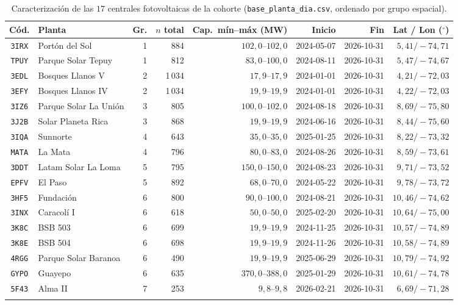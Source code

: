 \begin{table}[!htbp]
\caption{Caracterización de las $17$ centrales fotovoltaicas de la cohorte (\texttt{base\_planta\_dia.csv}, ordenado por grupo espacial).}\label{tab:flota17}
\scriptsize
\setlength{\tabcolsep}{3.5pt}
\begin{tabular}{@{}clrrrrrr@{}}
\toprule
Cód. & Planta & Gr. & $n$ total & Cap.\ mín--máx (MW) & Inicio & Fin & Lat / Lon ($^\circ$) \\
\midrule
\texttt{3IRX} & Portón del Sol & 1 & 884 & $102{,}0$--$102{,}0$ & 2024-05-07 & 2026-10-31 & $5{,}41 / -74{,}71$ \\
\texttt{TPUY} & Parque Solar Tepuy & 1 & 812 & $83{,}0$--$100{,}0$ & 2024-08-11 & 2026-10-31 & $5{,}47 / -74{,}67$ \\
\texttt{3EDL} & Bosques Llanos V & 2 & 1\,034 & $17{,}9$--$17{,}9$ & 2024-01-01 & 2026-10-31 & $4{,}21 / -72{,}03$ \\
\texttt{3EFY} & Bosques Llanos IV & 2 & 1\,034 & $19{,}9$--$19{,}9$ & 2024-01-01 & 2026-10-31 & $4{,}22 / -72{,}03$ \\
\texttt{3IZ6} & Parque Solar La Unión & 3 & 805 & $100{,}0$--$102{,}0$ & 2024-08-18 & 2026-10-31 & $8{,}69 / -75{,}80$ \\
\texttt{3J2B} & Solar Planeta Rica & 3 & 868 & $19{,}9$--$19{,}9$ & 2024-06-16 & 2026-10-31 & $8{,}44 / -75{,}60$ \\
\texttt{3IQA} & Sunnorte & 4 & 643 & $35{,}0$--$35{,}0$ & 2025-01-25 & 2026-10-31 & $8{,}22 / -73{,}32$ \\
\texttt{MATA} & La Mata & 4 & 796 & $80{,}0$--$83{,}0$ & 2024-08-26 & 2026-10-31 & $8{,}59 / -73{,}61$ \\
\texttt{3DDT} & Latam Solar La Loma & 5 & 795 & $150{,}0$--$150{,}0$ & 2024-08-23 & 2026-10-31 & $9{,}71 / -73{,}52$ \\
\texttt{EPFV} & El Paso & 5 & 892 & $68{,}0$--$70{,}0$ & 2024-05-22 & 2026-10-31 & $9{,}78 / -73{,}72$ \\
\texttt{3HF5} & Fundación & 6 & 800 & $90{,}0$--$100{,}0$ & 2024-08-21 & 2026-10-31 & $10{,}46 / -74{,}62$ \\
\texttt{3INX} & Caracolí I & 6 & 618 & $50{,}0$--$50{,}0$ & 2025-02-20 & 2026-10-31 & $10{,}64 / -75{,}00$ \\
\texttt{3K8C} & BSB 503 & 6 & 699 & $19{,}9$--$19{,}9$ & 2024-11-25 & 2026-10-31 & $10{,}57 / -74{,}89$ \\
\texttt{3K8E} & BSB 504 & 6 & 698 & $19{,}9$--$19{,}9$ & 2024-11-26 & 2026-10-31 & $10{,}58 / -74{,}89$ \\
\texttt{4RGG} & Parque Solar Baranoa & 6 & 490 & $19{,}9$--$19{,}9$ & 2025-06-29 & 2026-10-31 & $10{,}79 / -74{,}92$ \\
\texttt{GYPO} & Guayepo & 6 & 635 & $370{,}0$--$388{,}0$ & 2025-01-29 & 2026-10-31 & $10{,}61 / -74{,}78$ \\
\texttt{5F43} & Alma II & 7 & 253 & $9{,}8$--$9{,}8$ & 2026-02-21 & 2026-10-31 & $6{,}69 / -71{,}28$ \\
\botrule
\end{tabular}
\end{table}

